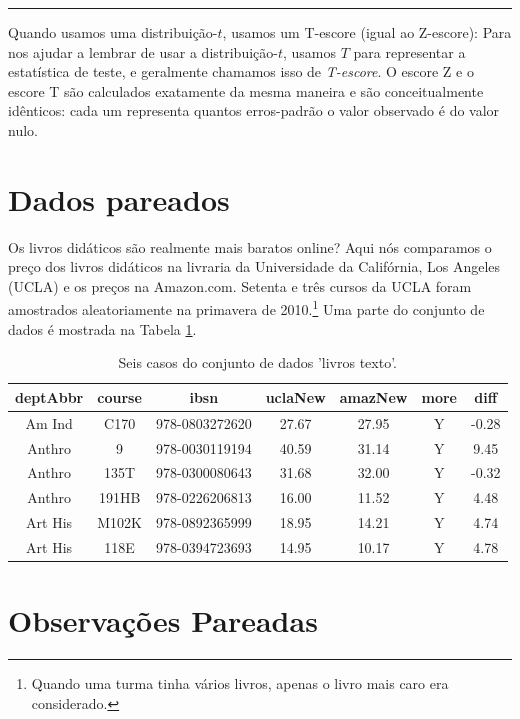 \documentclass[
]{book}
\theoremstyle{definition}
\theoremstyle{definition}
\theoremstyle{definition}
\theoremstyle{definition}
\theoremstyle{remark}
\begin{document}
\begin{center}\rule{0.5\linewidth}{0.5pt}\end{center}

Quando usamos uma distribuição-\(t\), usamos um T-escore (igual ao Z-escore): Para nos ajudar a lembrar de usar a distribuição-\(t\), usamos \(T\) para representar a estatística de teste, e geralmente chamamos isso de \emph{T-escore}. O escore Z e o escore T são calculados exatamente da mesma maneira e são conceitualmente idênticos: cada um representa quantos erros-padrão o valor observado é do valor nulo.

\hypertarget{pairedData}{%
\section{Dados pareados}\label{pairedData}}

Os livros didáticos são realmente mais baratos online? Aqui nós comparamos o preço dos livros didáticos na livraria da Universidade da Califórnia, Los Angeles (UCLA) e os preços na Amazon.com. Setenta e três cursos da UCLA foram amostrados aleatoriamente na primavera de 2010.\footnote{Quando uma turma tinha vários livros, apenas o livro mais caro era considerado.} Uma parte do conjunto de dados é mostrada na Tabela \ref{tab:textbooksDF}.

\begin{table}

\caption{\label{tab:textbooksDF}Seis casos do conjunto de dados 'livros texto'.}
\centering
\begin{tabular}[t]{c|c|c|c|c|c|c}
\hline
deptAbbr & course & ibsn & uclaNew & amazNew & more & diff\\
\hline
Am Ind & C170 & 978-0803272620 & 27.67 & 27.95 & Y & -0.28\\
\hline
Anthro & 9 & 978-0030119194 & 40.59 & 31.14 & Y & 9.45\\
\hline
Anthro & 135T & 978-0300080643 & 31.68 & 32.00 & Y & -0.32\\
\hline
Anthro & 191HB & 978-0226206813 & 16.00 & 11.52 & Y & 4.48\\
\hline
Art His & M102K & 978-0892365999 & 18.95 & 14.21 & Y & 4.74\\
\hline
Art His & 118E & 978-0394723693 & 14.95 & 10.17 & Y & 4.78\\
\hline
\end{tabular}
\end{table}

\hypertarget{pairedObservations}{%
\section{Observações Pareadas}\label{pairedObservations}}
\end{document}
